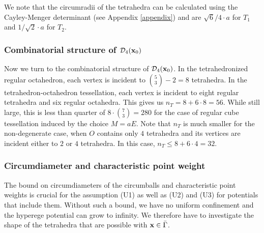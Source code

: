 We note that the circumradii of the tetrahedra can be calculated using the Cayley-Menger determinant (see Appendix \ref{appendix}) and are $\sqrt{6}/4 \cdot a$ for $T_1$ and $1/\sqrt{2}\cdot a$ for $T_2$.

\subsubsection{Combinatorial structure of $\mathcal D_4({\mathbf{x}}_0)$}\label{sec:combinatorial}
Now we turn to the combinatorial structure of $\mathcal D_4({\mathbf{x}}_0)$. In the tetrahedronized regular octahedron, each vertex is incident to $\binom{5}{3}-2=8$ tetrahedra. In the tetrahedron-octahedron tessellation, each  vertex is incident to eight regular tetrahedra and six regular octahedra. This gives us $n_T = 8 + 6\cdot 8 = 56$. While still large, this is less than quarter of $8\cdot \binom{7}{3} = 280$ for the case of regular cube tessellation induced by the choice $M=aE$. Note that $n_T$ is much smaller for the non-degenerate case, when $O$ contains only $4$ tetrahedra and its vertices are incident either to $2$ or $4$ tetrahedra. In this case, $n_T\leq 8+6\cdot 4 = 32$.


\subsubsection{Circumdiameter and characteristic point weight}
The bound on circumdiameters of the circumballs and characteristic point weights is crucial for the assumption (U1) as well as (U2) and (U3) for potentials that include them. Without such a bound, we have no uniform confinement and the hyperege potential can grow to infinity. We therefore have to investigate the shape of the tetrahedra that are possible with ${\mathbf{x}} \in \bar\Gamma$. 

